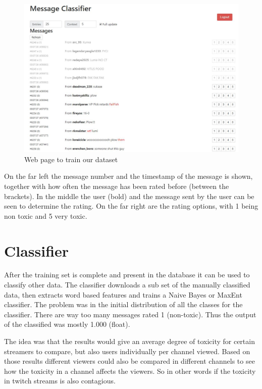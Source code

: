 \documentclass[final]{report}
\begin{document}
\begin{figure}[h]
\includegraphics[scale=0.5]{rating}
\caption{Web page to train our dataset}
\label{fig:rating}
\end{figure}

On the far left the message number and the timestamp of the message is shown, together with how often the message has been rated before (between the brackets). In the middle the user (bold) and the message sent by the user can be seen to determine the rating. On the far right are the rating options, with 1 being non toxic and 5 very toxic.

\section{Classifier}

After the training set is complete and present in the database it can be used to classify other data. The classifier downloads a sub set of the manually classified data, then extracts word based features and trains a Naive Bayes or MaxEnt classifier.
The problem was in the initial distribution of all the classes for the classifier.
There are way too many messages rated 1 (non-toxic).
Thus the output of the classified was mostly 1.000 (float).

The idea was that the results would give an average degree of toxicity for certain streamers to compare, but also users individually per channel viewed. Based on those results different viewers could also be compared in different channels to see how the toxicity in a channel affects the viewers. So in other words if the toxicity in twitch streams is also contagious.
\end{document}

